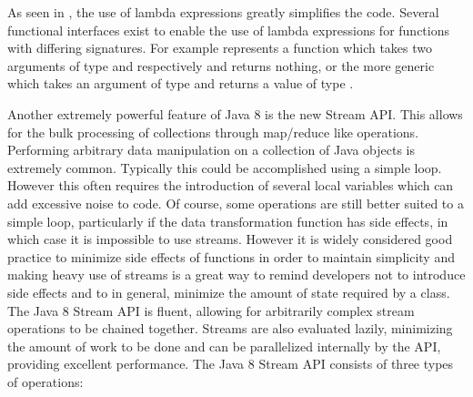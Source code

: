 

As seen in , the use of lambda expressions greatly simplifies the code. Several functional interfaces exist to enable the use of lambda expressions for functions with differing signatures. For example  represents a function which takes two arguments of type  and  respectively and returns nothing, or the more generic  which takes an argument of type  and returns a value of type .

Another extremely powerful feature of Java 8 is the new Stream API. This allows for the bulk processing of collections through map/reduce like operations. Performing arbitrary data manipulation on a collection of Java objects is extremely common. Typically this could be accomplished using a simple loop. However this often requires the introduction of several local variables which can add excessive noise to code. Of course, some operations are still better suited to a simple loop, particularly if the data transformation function has side effects, in which case it is impossible to use streams. However it is widely considered good practice to minimize side effects of functions in order to maintain simplicity and making heavy use of streams is a great way to remind developers not to introduce side effects and to in general, minimize the amount of state required by a class. The Java 8 Stream API is fluent, allowing for arbitrarily complex stream operations to be chained together. Streams are also evaluated lazily, minimizing the amount of work to be done and can be parallelized internally by the API, providing excellent performance. The Java 8 Stream API consists of three types of operations: 

